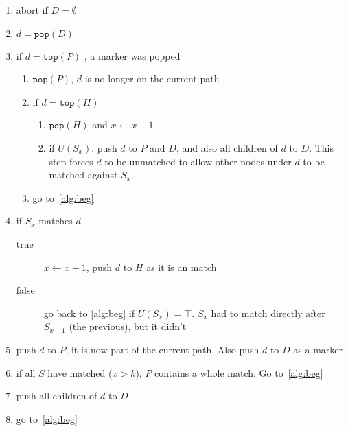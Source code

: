\documentclass[a4paper,12pt]{article}
\begin{document}
\begin{enumerate}[noitemsep]
  \item\label{alg:beg} abort if $D = \emptyset$
  \item $d = \mathtt{pop}(D)$
  \item if $d = \mathtt{top}(P)$ , a marker was popped
    \begin{enumerate}
      \item $\mathtt{pop}(P)$, $d$ is no longer on the current path
      \item if $d = \mathtt{top}(H)$
      \begin{enumerate}
        \item $\mathtt{pop}(H)$ and $x \gets x-1$
        \item if $U(S_x)$, push $d$ to $P$ and $D$, and also all children of $d$ to $D$.
        This step forces $d$ to be unmatched to allow other nodes under $d$ to
        be matched against $S_x$.
      \end{enumerate}
      \item go to~\ref{alg:beg}
    \end{enumerate}
  \item if $S_x$ matches $d$
    \begin{description}
      \item[true] $x \gets x+1$, push $d$ to $H$ as it is an match
      \item[false] go back to \ref{alg:beg} if $U(S_x) = \top$. $S_x$ had to match
      directly after $S_{x-1}$ (the previous), but it didn't
    \end{description}
  \item push $d$ to $P$, it is now part of the current path. Also push $d$ to $D$ as a marker
  \item if all $S$ have matched ($x > k$), $P$ contains a whole match. Go to~\ref{alg:beg}
  \item push all children of $d$ to $D$
  \item go to~\ref{alg:beg}
\end{enumerate}
\end{document}
